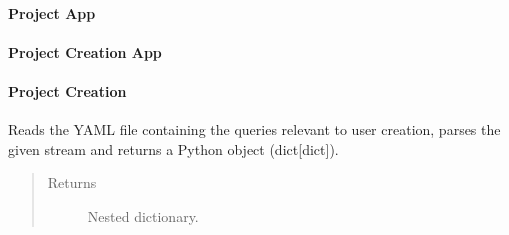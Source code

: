 \documentclass[letterpaper,10pt,english]{sphinxmanual}
\begin{document}
\paragraph{Project App}
\label{\detokenize{_autosummary/report_manager.apps:project-app}}

\paragraph{Project Creation App}
\label{\detokenize{_autosummary/report_manager.apps:project-creation-app}}

\paragraph{Project Creation}
\label{\detokenize{_autosummary/report_manager.apps:module-report_manager.apps.projectCreation}}\label{\detokenize{_autosummary/report_manager.apps:project-creation}}

\begin{fulllineitems}
\label{\detokenize{_autosummary/report_manager.apps:report_manager.apps.projectCreation.get_project_creation_queries}}
Reads the YAML file containing the queries relevant to user creation, parses the given stream and     returns a Python object (dict{[}dict{]}).
\begin{quote}\begin{description}
\item[{Returns}] \leavevmode
Nested dictionary.

\end{description}\end{quote}

\end{fulllineitems}

\end{document}
